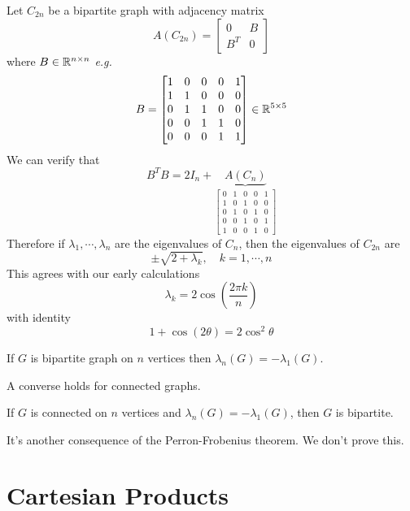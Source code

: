 \begin{example}
Let \(C_{2n}\) be a bipartite graph with adjacency matrix 
\[ A(C_{2n})=\begin{bmatrix}0 & B \\ B^T & 0\end{bmatrix} \]
where \(B\in\mathbb{R}^{n\times n}\) \textit{e.g.}
\[B = \begin{bmatrix}1&0&0&0&1 \\ 1&1&0&0&0 \\ 0&1&1&0&0 \\ 0&0&1&1&0 \\ 0&0&0&1&1 \end{bmatrix}\in\mathbb{R}^{5\times 5} \]
We can verify that
\[ B^T B=2I_n+\underbrace{A(C_n)}_{\begin{bmatrix}0&1&0&0&1 \\ 1&0&1&0&0 \\ 0&1&0&1&0 \\ 0&0&1&0&1 \\ 1&0&0&1&0 \end{bmatrix}} \]
Therefore if \(\lambda_1,\cdots,\lambda_n\) are the eigenvalues of \(C_n\), then the eigenvalues of \(C_{2n}\) are
\[ \pm\sqrt{2+\lambda_k}, \quad k=1,\cdots,n \]
This agrees with our early calculations
\[ \lambda_k=2\cos\left(\frac{2\pi k}{n} \right) \]
with identity
\[ 1+\cos(2\theta)=2\cos^2\theta \]
\end{example}


\begin{corollary}
If \(G\) is bipartite graph on \(n\) vertices then \(\lambda_n(G)=-\lambda_1(G)\).
\end{corollary}
\begin{remark}
A converse holds for connected graphs.
\end{remark}
\begin{proposition}
If \(G\) is connected on \(n\) vertices and \(\lambda_n(G)=-\lambda_1(G)\), then \(G\) is bipartite.
\end{proposition}
\begin{remark}
It's another consequence of the Perron-Frobenius theorem. We don't prove this.
\end{remark}



\section{Cartesian Products}





